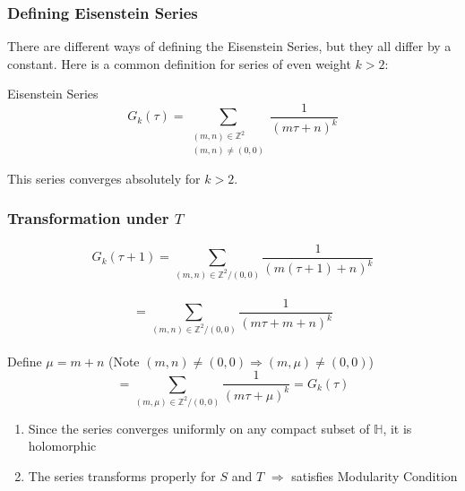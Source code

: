 \documentclass{beamer}
\begin{document}
\begin{frame}

\frametitle{Defining Eisenstein Series}
There are different ways of defining the Eisenstein Series, but they all differ by a constant. Here is a common definition for series of even weight $k>2$: 
\begin{block}{Eisenstein Series}
$$G_k(\tau) = \sum_{\substack{(m,n) \in \mathbb{Z}^2 \\ (m,n) \neq (0,0)}}  \frac{1}{(m \tau + n)^k}$$
\end{block}
This series converges absolutely for $k>2$.

\end{frame}

\begin{frame}
\frametitle{Transformation under $T$}

$$G_k(\tau + 1) = \sum_{(m,n) \in \mathbb{Z}^2/(0,0)}  \frac{1}{(m (\tau +1) + n)^k}$$\\
$$ = \sum_{(m,n) \in \mathbb{Z}^2/(0,0)}  \frac{1}{(m \tau + m +  n)^k}$$ \\
Define $\mu=m+n$ (Note $(m,n) \neq (0,0) \Rightarrow (m, \mu) \neq (0,0)$) \\
$$=  \sum_{(m,\mu) \in \mathbb{Z}^2/(0,0)}  \frac{1}{(m \tau + \mu)^k} = G_k(\tau)$$



\end{frame}

\begin{frame}

\begin{enumerate}
\item Since the series converges uniformly on any compact subset of $\mathbb{H}$, it is holomorphic
\item The series transforms properly for $S$ and $T$ $\Rightarrow$ satisfies Modularity Condition


 
\end{enumerate}

\end{frame}
\end{document}
